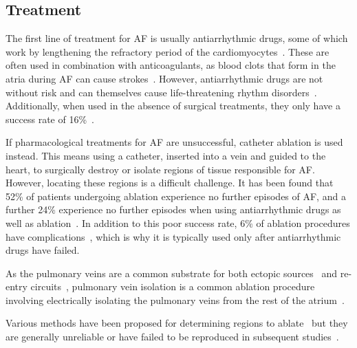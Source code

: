 \subsection{Treatment}

The first line of treatment for AF is usually antiarrhythmic drugs, some of which work by lengthening the refractory period of the cardiomyocytes~\cite{bajpai2006atrial}. These are often used in combination with anticoagulants, as blood clots that form in the atria during AF can cause strokes~\cite{bajpai2006atrial}. However, antiarrhythmic drugs are not without risk and can themselves cause life-threatening rhythm disorders~\cite{nattel1998experimental}. Additionally, when used in the absence of surgical treatments, they only have a success rate of 16\%~\cite{wilber2010comparison}.

If pharmacological treatments for AF are unsuccessful, catheter ablation is used instead. This means using a catheter, inserted into a vein and guided to the heart, to surgically destroy or isolate regions of tissue responsible for AF. However, locating these regions is a difficult challenge. It has been found that 52\% of patients undergoing ablation experience no further episodes of AF, and a further 24\% experience no further episodes when using antiarrhythmic drugs as well as ablation~\cite{cappato2005worldwide}. In addition to this poor success rate, 6\% of ablation procedures have complications~\cite{deshmukh2013hospital}, which is why it is typically used only after antiarrhythmic drugs have failed.

As the pulmonary veins are a common substrate for both ectopic sources~\cite{haissaguerre1998spontaneous} and re-entry circuits~\cite{ehrlich2003cellular}, pulmonary vein isolation is a common ablation procedure involving electrically isolating the pulmonary veins from the rest of the atrium~\cite{calkins2007hrs}. 

Various methods have been proposed for determining regions to ablate~\cite{narayan2012treatment, nademanee2004new, hunter2011characterization, kottkamp2016box, miller2014initial, sommer2016successful} but they are generally unreliable or have failed to be reproduced in subsequent studies~\cite{calkins2007hrs, BUCH2016636, verma2015approaches, providencia2015there}. 


